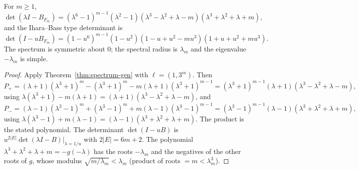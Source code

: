 \begin{theorem}[Spectrum of $B_{F_m}$]\label{thm:spectrum}
For $m\ge1$,
\[
\det(\lambda I-B_{F_m})=(\lambda^6-1)^{m-1}(\lambda^2-1)(\lambda^3-\lambda^2+\lambda-m)(\lambda^3+\lambda^2+\lambda+m),
\]
and the Ihara--Bass type determinant is
\[
\det(I-uB_{F_m})=(1-u^6)^{m-1}(1-u^2)(1-u+u^2-mu^3)(1+u+u^2+mu^3).
\]
The spectrum is symmetric about $0$; the spectral radius is $\lambda_m$ and the eigenvalue $-\lambda_m$ is simple.
\end{theorem}
\begin{proof}
Apply Theorem~\ref{thm:spectrum-gen} with $\ell=(1,3^m)$. Then
\[
P_+=(\lambda+1)(\lambda^3+1)^m-(\lambda^3+1)^m-m(\lambda+1)(\lambda^3+1)^{m-1}=(\lambda^3+1)^{m-1}(\lambda+1)(\lambda^3-\lambda^2+\lambda-m),
\]
using $\lambda(\lambda^3+1)-m(\lambda+1)=(\lambda+1)(\lambda^3-\lambda^2+\lambda-m)$, and
\[
P_-=(\lambda-1)(\lambda^3-1)^m+(\lambda^3-1)^m+m(\lambda-1)(\lambda^3-1)^{m-1}=(\lambda^3-1)^{m-1}(\lambda-1)(\lambda^3+\lambda^2+\lambda+m),
\]
using $\lambda(\lambda^3-1)+m(\lambda-1)=(\lambda-1)(\lambda^3+\lambda^2+\lambda+m)$. The product is the stated polynomial. The determinant $\det(I-uB)$ is $u^{2|E|}\det(\lambda I-B)|_{\lambda=1/u}$ with $2|E|=6m+2$. The polynomial $\lambda^3+\lambda^2+\lambda+m=-g(-\lambda)$ has the roots $-\lambda_m$ and the negatives of the other roots of $g$, whose modulus $\sqrt{m/\lambda_m}<\lambda_m$ (product of roots $=m<\lambda_m^3$). \qedhere
\end{proof}

